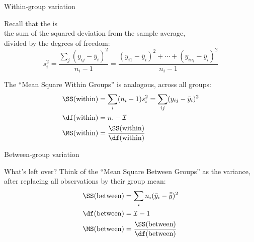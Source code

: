 \begin{frame}{Within-group variation}

  Recall that the  is \\
  the sum of the squared deviation from the sample average,\\
  divided by the degrees of freedom:
  \[
  s_i^2 = \frac{ \sum_j (y_{ij}-\bar y_i)^2 }{ n_i-1 } = \frac{ (y_{i1} - \bar y_i)^2 + \cdots + (y_{in_i} - \bar y_i)^2 }{n_i-1}
  \]

    \vspace{2em}

    The ``\alert{Mean Square Within Groups}'' is analogous, across all groups:
    \begin{align*}
      \SS(\text{within}) &= \sum_{i} (n_i-1) s_i^2 = \sum_{ij} (y_{ij}-\bar y_i)^2 \\
        \df(\text{within}) &= n_\cdot - \mathcal{I} \\
      \MS(\text{within}) &= \frac{\SS(\text{within})}{\df(\text{within})}
    \end{align*}


\end{frame}

\begin{frame}{Between-group variation}

  What's left over? 
  Think of the ``\alert{Mean Square Between Groups}'' 
  as the variance, after replacing all observations by their group mean:
  \begin{align*}
    \SS(\text{between}) &= \sum_{i} n_i (\bar y_i - \bar{\bar y})^2 \\
      \df(\text{between}) &= \mathcal{I} - 1 \\
      \MS(\text{between}) &= \frac{\SS(\text{between})}{\df(\text{between})}
  \end{align*}

\end{frame}

